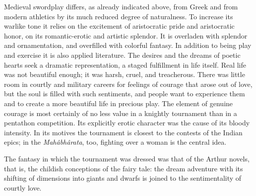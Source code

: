 Medieval swordplay differs, as already indicated above, from Greek and
from modern athletics by its much reduced degree of naturalness. To
increase its warlike tone it relies on the excitement of aristocratic
pride and aristocratic honor, on its romantic-erotic and artistic
splendor. It is overladen with splendor and ornamentation, and
overfilled with colorful fantasy. In addition to being play and exercise
it is also applied literature. The desires and the dreams of poetic
hearts seek a dramatic representation, a staged fulfillment in life
itself. Real life was not beautiful enough; it was harsh, cruel, and
treacherous. There was little room in courtly and military careers for
feelings of courage that arose out of love, but the soul is filled with
such sentiments, and people want to experience them and to create a more
beautiful life in precious play. The element of genuine courage is most
certainly of no less value in a knightly tournament than in a pentathon
competition. Its explicitly erotic character was the cause of its bloody
intensity. In its motives the tournament is closest to the contests of
the Indian epics; in the \emph{Mahâbhârata}, too, fighting over a woman
is the central idea.

\protect\hypertarget{10_Chapter_Three__THE_HEROIC_DREAM.xhtmlux5cux23page_90}{}{}The
fantasy in which the tournament was dressed was that of the Arthur
novels, that is, the childish conceptions of the fairy tale: the dream
adventure with its shifting of dimensions into giants and dwarfs is
joined to the sentimentality of courtly love.

